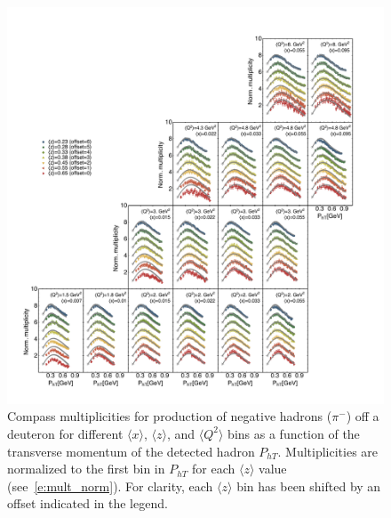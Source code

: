 \documentclass[aps,preprintnumbers,showpacs,nofootinbib,superscriptaddress,floatfix]{revtex4}
\begin{document}
\begin{figure}[h!]
\begin{center}
\includegraphics[width=\textwidth]{plots/COMPASS_SCIplot_flINDEP_Piminus.pdf}
\end{center}
\caption{Compass multiplicities for production of negative hadrons ($\pi^-$) off a deuteron for different $\langle x \rangle$, $\langle z \rangle$, and $\langle Q^2 \rangle$ bins as a function of the transverse momentum of the detected hadron  $P_{hT}$. Multiplicities are normalized to the first bin in $P_{hT}$ for each $\langle z \rangle$ value (see~\eqref{e:mult_norm}). For clarity, each $\langle z \rangle$  bin has been shifted by an offset indicated in the legend.} 
\label{f:C_pim}
\end{figure}
\end{document}

